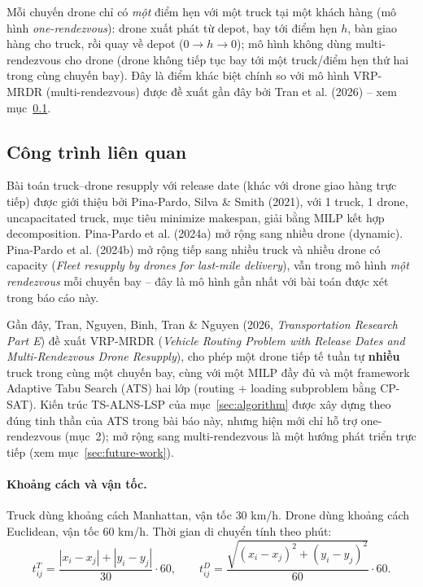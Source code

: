 \documentclass[12pt,a4paper]{article}
\begin{document}
Mỗi chuyến drone chỉ có \emph{một} điểm hẹn với một truck tại một khách hàng (mô hình
\emph{one-rendezvous}): drone xuất phát từ depot, bay tới điểm hẹn $h$, bàn giao hàng
cho truck, rồi quay về depot ($0 \to h \to 0$); mô hình không dùng multi-rendezvous
cho drone (drone không tiếp tục bay tới một truck/điểm hẹn thứ hai trong cùng chuyến
bay). Đây là điểm khác biệt chính so với mô hình VRP-MRDR (multi-rendezvous) được đề
xuất gần đây bởi Tran et al. (2026) -- xem mục~\ref{sec:related-work}.

\subsection{Công trình liên quan}
\label{sec:related-work}

Bài toán truck--drone resupply với release date (khác với drone giao hàng trực tiếp)
được giới thiệu bởi Pina-Pardo, Silva \& Smith (2021), với 1 truck, 1 drone,
uncapacitated truck, mục tiêu minimize makespan, giải bằng MILP kết hợp decomposition.
Pina-Pardo et al. (2024a) mở rộng sang nhiều drone (dynamic). Pina-Pardo et al.
(2024b) mở rộng tiếp sang nhiều truck và nhiều drone có capacity (\emph{Fleet resupply
by drones for last-mile delivery}), vẫn trong mô hình \emph{một rendezvous} mỗi chuyến
bay -- đây là mô hình gần nhất với bài toán được xét trong báo cáo này.

Gần đây, Tran, Nguyen, Binh, Tran \& Nguyen (2026, \emph{Transportation Research Part
E}) đề xuất VRP-MRDR (\emph{Vehicle Routing Problem with Release Dates and
Multi-Rendezvous Drone Resupply}), cho phép một drone tiếp tế tuần tự \textbf{nhiều}
truck trong cùng một chuyến bay, cùng với một MILP đầy đủ và một framework Adaptive
Tabu Search (ATS) hai lớp (routing + loading subproblem bằng CP-SAT). Kiến trúc
TS-ALNS-LSP của mục~\ref{sec:algorithm} được xây dựng theo đúng tinh thần của ATS
trong bài báo này, nhưng hiện mới chỉ hỗ trợ one-rendezvous (mục~2); mở rộng sang
multi-rendezvous là một hướng phát triển trực tiếp (xem mục~\ref{sec:future-work}).

\paragraph{Khoảng cách và vận tốc.} Truck dùng khoảng cách Manhattan, vận tốc $30$
km/h. Drone dùng khoảng cách Euclidean, vận tốc $60$ km/h. Thời gian di chuyển tính
theo phút:
\[
  t^T_{ij}=\frac{|x_i-x_j|+|y_i-y_j|}{30}\cdot 60,\qquad
  t^D_{ij}=\frac{\sqrt{(x_i-x_j)^2+(y_i-y_j)^2}}{60}\cdot 60.
\]
\end{document}
